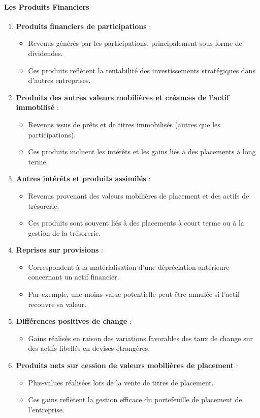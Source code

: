 \documentclass[a4paper, 12pt]{report}
\begin{document}
\paragraph*{Les Produits Financiers}
\begin{enumerate}
	\item \textbf{Produits financiers de participations} :
	\begin{itemize}
		\item Revenus générés par les participations, principalement sous forme de dividendes.
		\item Ces produits reflètent la rentabilité des investissements stratégiques dans d'autres entreprises.
	\end{itemize}
	\item \textbf{Produits des autres valeurs mobilières et créances de l'actif immobilisé} :
	\begin{itemize}
		\item Revenus issus de prêts et de titres immobilisés (autres que les participations).
		\item Ces produits incluent les intérêts et les gains liés à des placements à long terme.
	\end{itemize}
	\item \textbf{Autres intérêts et produits assimilés} :
	\begin{itemize}
		\item Revenus provenant des valeurs mobilières de placement et des actifs de trésorerie.
		\item Ces produits sont souvent liés à des placements à court terme ou à la gestion de la trésorerie.
	\end{itemize}
	\item \textbf{Reprises sur provisions} :
	\begin{itemize}
		\item Correspondent à la matérialisation d'une dépréciation antérieure concernant un actif financier.
		\item Par exemple, une moins-value potentielle peut être annulée si l'actif recouvre sa valeur.
	\end{itemize}
	\item \textbf{Différences positives de change} :
	\begin{itemize}
		\item Gains réalisés en raison des variations favorables des taux de change sur des actifs libellés en devises étrangères.
	\end{itemize}
	\item \textbf{Produits nets sur cession de valeurs mobilières de placement} :
	\begin{itemize}
		\item Plus-values réalisées lors de la vente de titres de placement.
		\item Ces gains reflètent la gestion efficace du portefeuille de placement de l'entreprise.
	\end{itemize}
\end{enumerate}
\end{document}
